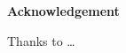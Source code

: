 
\chapterend

\begin{titlepage}

\begin{center}\large\bf
Acknowledgement
\end{center}
Thanks to \ldots

\end{titlepage}



\chapterend
